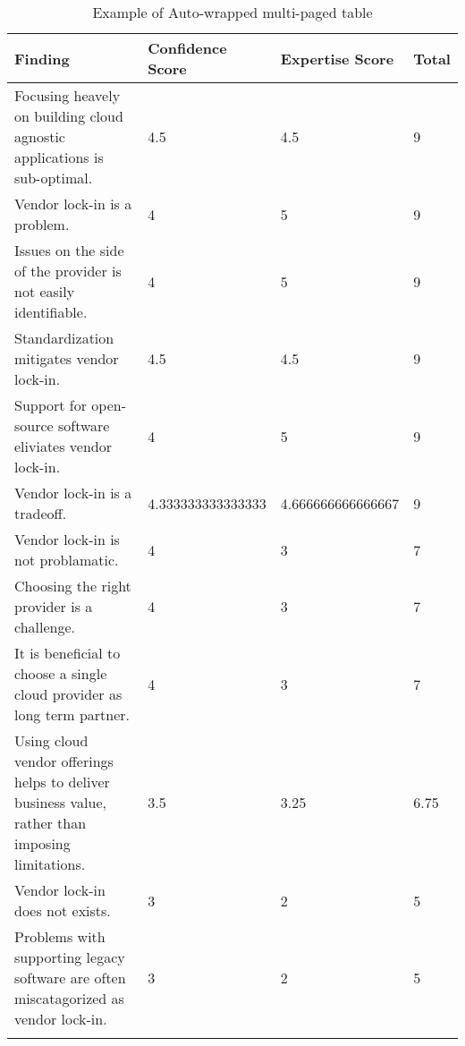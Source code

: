 
\renewcommand\arraystretch{1.5}%
\begin{longtable}{|p{10cm}|p{2cm}|p{2cm}|}
\hline
\textbf{Finding}  & \textbf{Confidence Score} & \textbf{Expertise Score} & \textbf{Total} \\ \hline
\endhead
Focusing heavely on building cloud agnostic applications is sub-optimal. & 4.5 & 4.5 & 9 \\ \hline
Vendor lock-in is a problem. & 4 & 5 & 9 \\ \hline
Issues on the side of the provider is not easily identifiable. & 4 & 5 & 9 \\ \hline
Standardization mitigates vendor lock-in. & 4.5 & 4.5 & 9 \\ \hline
Support for open-source software eliviates vendor lock-in. & 4 & 5 & 9 \\ \hline
Vendor lock-in is a tradeoff. & 4.333333333333333 & 4.666666666666667 & 9 \\ \hline
Vendor lock-in is not problamatic. & 4 & 3 & 7 \\ \hline
Choosing the right provider is a challenge. & 4 & 3 & 7 \\ \hline
It is beneficial to choose a single cloud provider as long term partner. & 4 & 3 & 7 \\ \hline
Using cloud vendor offerings helps to deliver business value, rather than imposing limitations. & 3.5 & 3.25 & 6.75 \\ \hline
Vendor lock-in does not exists. & 3 & 2 & 5 \\ \hline
Problems with supporting legacy software are often miscatagorized as vendor lock-in. & 3 & 2 & 5 \\ \hline
\caption{Example of Auto-wrapped multi-paged table}
\label{tab:table1}
\end{longtable}
